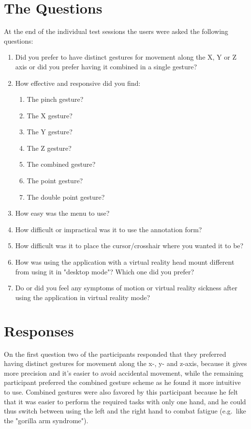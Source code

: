 \section{The Questions}
At the end of the individual test sessions the users were asked the following questions:

\begin{enumerate}
      \item Did you prefer to have distinct gestures for movement along the X, Y or Z axis or did you prefer having it combined in a single gesture?
      \item How effective and responsive did you find:
      \begin{enumerate}
            \item The pinch gesture?
            \item The X gesture?
            \item The Y gesture?
            \item The Z gesture?
            \item The combined gesture?
            \item The point gesture?
            \item The double point gesture?
      \end{enumerate}
      \item How easy was the menu to use?
      \item How difficult or impractical was it to use the annotation form?
      \item How difficult was it to place the cursor/crosshair where you wanted it to be?     
      \item How was using the application with a virtual reality head mount different from using it in "desktop mode"? 
            Which one did you prefer?
      \item Do or did you feel any symptoms of motion or virtual reality sickness after using the application in virtual reality mode?
\end{enumerate}

\section{Responses}
On the first question two of the participants responded that they preferred having distinct gestures for movement along the x-, y- and z-axis, because 
it gives more precision and it's easier to avoid accidental movement, while the remaining participant preferred the combined gesture scheme as 
he found it more intuitive to use. Combined gestures were also favored by this participant because he felt that it was easier to perform the 
required tasks with only one hand, and he could thus switch between using the left and the right hand to combat fatigue (e.g.~like the "gorilla arm syndrome").  

